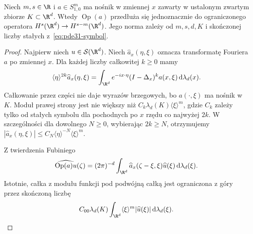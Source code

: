 \begin{twierdzenie}
\label{thm:pde31-compact-symbol}
Niech $m,s\in\R$ i $a\in S^m_{1,0}$ ma nośnik w zmiennej $x$
zawarty w ustalonym zwartym zbiorze $K\subset\R^d$.
Wtedy $\operatorname{Op}(a)$ przedłuża się jednoznacznie do
ograniczonego operatora $H^s(\R^d)\to H^{s-m}(\R^d)$.
Jego norma zależy od $m,s,d,K$ i skończonej liczby
stałych z~\eqref{eq:pde31-symbol}.
\end{twierdzenie}
\begin{proof}
Najpierw niech $u\in\mathcal S(\R^d)$.
Niech $\widehat a_x(\eta,\xi)$ oznacza transformatę
Fouriera $a$ po zmiennej $x$. Dla każdej liczby
całkowitej $k\ge0$ mamy
\[
 \langle\eta\rangle^{2k}\widehat a_x(\eta,\xi)
 =\int_{\R^d}e^{-ix\cdot\eta}(I-\Delta_x)^ka(x,\xi)
 \,\mathrm d\lambda_d(x).
\]
Całkowanie przez części nie daje wyrazów brzegowych,
bo $a(\cdot,\xi)$ ma nośnik w $K$.
Moduł prawej strony jest nie większy niż
$C_k\lambda_d(K)\langle\xi\rangle^m$,
gdzie $C_k$ zależy tylko od stałych symbolu
dla pochodnych po $x$ rzędu co najwyżej $2k$.
W szczególności dla dowolnego $N\ge0$,
wybierając $2k\ge N$, otrzymujemy
$|\widehat a_x(\eta,\xi)|\le
C_N\langle\eta\rangle^{-N}\langle\xi\rangle^m$.

Z twierdzenia Fubiniego
\[
 \widehat{\operatorname{Op}(a)u}(\zeta)
 =(2\pi)^{-d}\int_{\R^d}
 \widehat a_x(\zeta-\xi,\xi)\widehat u(\xi)
 \,\mathrm d\lambda_d(\xi).
\]
Istotnie, całka z modułu funkcji pod podwójną
całką jest ograniczona z góry przez skończoną liczbę
\[
 C_{00}\lambda_d(K)\int_{\R^d}
 \langle\xi\rangle^m|\widehat u(\xi)|\,\mathrm d\lambda_d(\xi).
\]


\end{proof}
